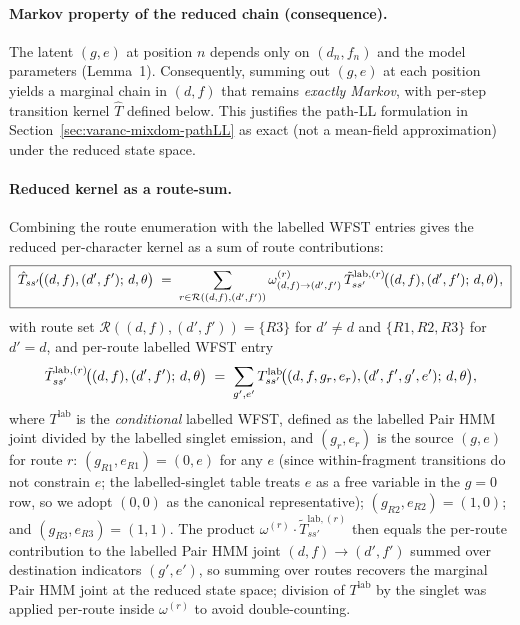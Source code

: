 \paragraph{Markov property of the reduced chain (consequence).}
The latent $(g, e)$ at position $n$ depends only on $(d_n, f_n)$
and the model parameters (Lemma~1). Consequently, summing out
$(g, e)$ at each position yields a marginal chain in $(d, f)$ that
remains \emph{exactly Markov}, with per-step transition kernel
$\hat T$ defined below. This justifies the path-LL formulation in
Section~\ref{sec:varanc-mixdom-pathLL} as exact (not a
mean-field approximation) under the reduced state space.

\paragraph{Reduced kernel as a route-sum.}
Combining the route enumeration with the labelled WFST entries
gives the reduced per-character kernel as a sum of route
contributions:
\begin{equation}
\label{eq:T-hat}
\boxed{\;
\hat{T}_{ss'}\!\big((d, f), (d', f');\, d, \theta\big)
\;=\; \sum_{r \in \mathcal{R}((d, f), (d', f'))}
   \omega^{(r)}_{(d, f) \to (d', f')}\,
   \tilde{T}^{\text{lab}, (r)}_{ss'}\!\big((d, f), (d', f');\, d, \theta\big),
\;}
\end{equation}
with route set $\mathcal{R}((d, f), (d', f')) = \{R3\}$ for
$d' \neq d$ and $\{R1, R2, R3\}$ for $d' = d$, and per-route
labelled WFST entry
\begin{equation}
\label{eq:tilde-T-lab-r}
\tilde{T}^{\text{lab}, (r)}_{ss'}\!\big((d, f), (d', f');\, d, \theta\big)
\;=\; \sum_{g', e'} T^{\text{lab}}_{ss'}\!\big((d, f, g_r, e_r), (d', f', g', e');\, d, \theta\big),
\end{equation}
where $T^{\text{lab}}$ is the \emph{conditional} labelled WFST,
defined as the labelled Pair HMM
joint divided by the labelled singlet emission, and
$(g_r, e_r)$ is the source $(g, e)$ for route $r$:
$(g_{R1}, e_{R1}) = (0, e)$ for any $e$ (since within-fragment
transitions do not constrain $e$; the labelled-singlet table treats
$e$ as a free variable in the
$g{=}0$ row, so we adopt $(0, 0)$ as the canonical representative);
$(g_{R2}, e_{R2}) = (1, 0)$; and $(g_{R3}, e_{R3}) = (1, 1)$.
The product $\omega^{(r)} \cdot \tilde{T}^{\text{lab}, (r)}_{ss'}$
then equals the per-route contribution to the labelled Pair HMM
joint $(d, f) \to (d', f')$ summed over destination indicators
$(g', e')$, so summing over routes recovers the marginal Pair HMM
joint at the reduced state space; division of $T^{\text{lab}}$
by the singlet was applied per-route inside $\omega^{(r)}$ to
avoid double-counting.

